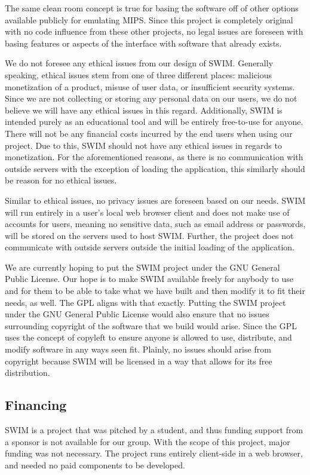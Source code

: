 \documentclass[
    paper=letter,
    parskip=half,
    fontsize=12pt,
    titlepage=firstiscover,
    toc=bibliography,
    numbers=endperiod
]{scrartcl}
\begin{document}
The same clean room concept is true for basing the software off of other
options available publicly for emulating MIPS. Since this project is
completely original with no code influence from these other projects, no
legal issues are foreseen with basing features or aspects of the
interface with software that already exists.

We do not foresee any ethical issues from our design of SWIM. Generally
speaking, ethical issues stem from one of three different places:
malicious monetization of a product, misuse of user data, or
insufficient security systems. Since we are not collecting or storing
any personal data on our users, we do not believe we will have any
ethical issues in this regard. Additionally, SWIM is intended purely as
an educational tool and will be entirely free-to-use for anyone. There
will not be any financial costs incurred by the end users when using our
project. Due to this, SWIM should not have any ethical issues in regards
to monetization. For the aforementioned reasons, as there is no
communication with outside servers with the exception of loading the
application, this similarly should be reason for no ethical issues.

Similar to ethical issues, no privacy issues are foreseen based on our
needs. SWIM will run entirely in a user's local web browser client and
does not make use of accounts for users, meaning no sensitive data, such
as email address or passwords, will be stored on the servers used to
host SWIM. Further, the project does not communicate with outside
servers outside the initial loading of the application.

We are currently hoping to put the SWIM project under the GNU General
Public License. Our hope is to make SWIM available freely for anybody to
use and for them to be able to take what we have built and then modify
it to fit their needs, as well. The GPL aligns with that exactly.
Putting the SWIM project under the GNU General Public License would also
ensure that no issues surrounding copyright of the software that we
build would arise. Since the GPL uses the concept of copyleft to ensure
anyone is allowed to use, distribute, and modify software in any ways
seen fit. Plainly, no issues should arise from copyright because SWIM
will be licensed in a way that allows for its free distribution.

\subsection{Financing}
SWIM is a project that was pitched by a student, and thus funding
support from a sponsor is not available for our group. With the scope of
this project, major funding was not necessary. The project runs entirely
client-side in a web browser, and needed no paid components to be
developed.
\end{document}
